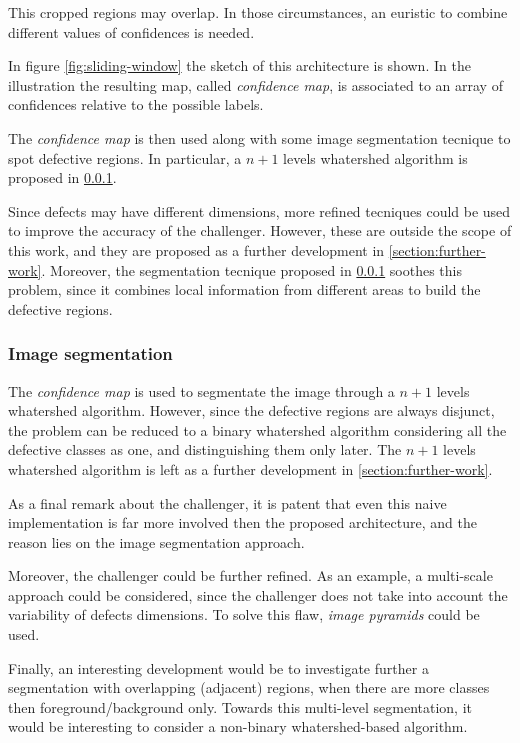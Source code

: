         \par{
            This cropped regions may overlap. In those circumstances, an euristic to combine different values of confidences is needed.
        }
        \par{
            In figure \ref{fig:sliding-window} the sketch of this architecture is shown. In the illustration the resulting map, called \emph{confidence map}, is associated to an array of confidences relative to the possible labels. 
        }
        \par{
            The \emph{confidence map} is then used along with some image segmentation tecnique to spot defective regions. In particular, a $n+1$ levels whatershed algorithm is proposed in \ref{section:challenger:image-segmentation}.
        }
        \par{
            Since defects may have different dimensions, more refined tecniques could be used to improve the accuracy of the challenger. However, these are outside the scope of this work, and they are proposed as a further development in \ref{section:further-work}. Moreover, the segmentation tecnique proposed in \ref{section:challenger:image-segmentation} soothes this problem, since it combines local information from different areas to build the defective regions.
        }
    \subsubsection{Image segmentation}\label{section:challenger:image-segmentation}
        \par{
            The \emph{confidence map} is used to segmentate the image through a $n+1$ levels whatershed algorithm. However, since the defective regions are always disjunct, the problem can be reduced to a binary whatershed algorithm \cite{ieee:87344} considering all the defective classes as one, and distinguishing them only later. The $n+1$ levels whatershed algorithm is left as a further development in \ref{section:further-work}.
        }
        \par{
            As a final remark about the challenger, it is patent that even this naive implementation is far more involved then the proposed architecture, and the reason lies on the image segmentation approach.
        }
    \par{
        Moreover, the challenger could be further refined. As an example, a multi-scale approach could be considered, since the challenger does not take into account the variability of defects dimensions. To solve this flaw, \emph{image pyramids} could be used.
    }
    \par{
        Finally, an interesting development would be to investigate further a segmentation with overlapping (adjacent) regions, when there are more classes then foreground/background only. Towards this multi-level segmentation, it would be interesting to consider a non-binary whatershed-based algorithm.
    }